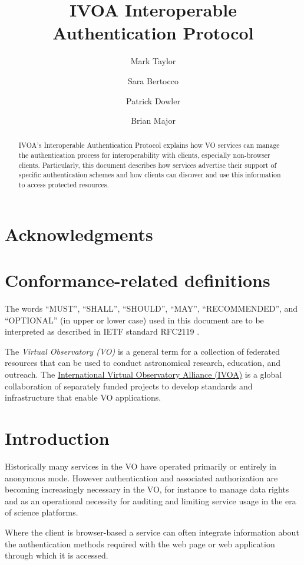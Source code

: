\documentclass[11pt,a4paper]{ivoa}
\title{IVOA Interoperable Authentication Protocol}
\author{Mark Taylor}
\author{Sara Bertocco}
\author{Patrick Dowler}
\author{Brian Major}
\begin{document}
\begin{abstract}
IVOA's Interoperable Authentication Protocol explains how
VO services can manage the authentication process for
interoperability with clients, especially non-browser clients.
Particularly, this document
describes how services advertise their
support of specific authentication schemes and how
clients can discover and use this information to access protected
resources.
\end{abstract}


\section*{Acknowledgments}


\section*{Conformance-related definitions}

The words ``MUST'', ``SHALL'', ``SHOULD'', ``MAY'', ``RECOMMENDED'', and
``OPTIONAL'' (in upper or lower case) used in this document are to be
interpreted as described in IETF standard RFC2119 \citep{std:RFC2119}.

The \emph{Virtual Observatory (VO)} is a
general term for a collection of federated resources that can be used
to conduct astronomical research, education, and outreach.
The \href{https://www.ivoa.net}{International
Virtual Observatory Alliance (IVOA)} is a global
collaboration of separately funded projects to develop standards and
infrastructure that enable VO applications.


\section{Introduction}\label{sec:intro}

Historically many services in the VO have operated primarily or
entirely in anonymous mode.
However authentication and associated authorization
are becoming increasingly necessary in the VO,
for instance to manage data rights and as an operational necessity for
auditing and limiting service usage in the era of science platforms.

Where the client is browser-based
a service can often integrate information about the authentication
methods required with the web page or web application through which
it is accessed.
\end{document}
